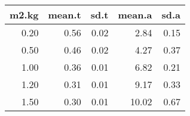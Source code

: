 \begin{table}[ht]
\centering
\begin{tabular}{rrrrr}
  \hline
m2.kg & mean.t & sd.t & mean.a & sd.a \\ 
  \hline
0.20 & 0.56 & 0.02 & 2.84 & 0.15 \\ 
  0.50 & 0.46 & 0.02 & 4.27 & 0.37 \\ 
  1.00 & 0.36 & 0.01 & 6.82 & 0.21 \\ 
  1.20 & 0.31 & 0.01 & 9.17 & 0.33 \\ 
  1.50 & 0.30 & 0.01 & 10.02 & 0.67 \\ 
   \hline
\end{tabular}
\end{table}
